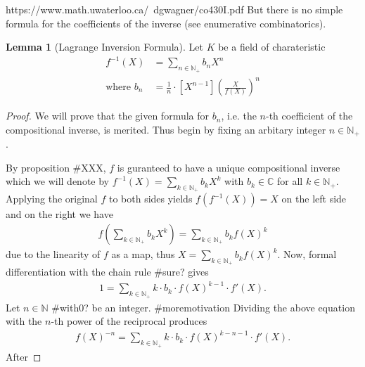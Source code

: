 \documentclass[a4paper]{article}
\theoremstyle{definition}
\newtheorem{lemma}[definition]{Lemma}
\begin{document}
https://www.math.uwaterloo.ca/~dgwagner/co430I.pdf
%
But there is no simple formula for the coefficients of the inverse (see enumerative combinatorics).
%
\begin{lemma}[Lagrange Inversion Formula]
    Let \(K\) be a field of charateristic
    \begin{align*}
        f^{-1}(X) &= \sum_{n \in \mathbb{N}_+} b_n X^n\\
        \text{where } b_n &= \frac{1}{n} \cdot [X^{n-1}] \left(\frac{X}{f(X)}\right)^n
    \end{align*}
\end{lemma}
%
\begin{proof}
    We will prove that the given formula for \(b_n\), i.e. the \(n\)-th coefficient of the compositional inverse, is merited. Thus begin by fixing an arbitary integer \(n \in \mathbb{N}_+\).


    By proposition \#XXX, \(f\) is guranteed to have a unique compositional inverse which we will denote by \(f^{-1}(X) = \sum_{k \in \mathbb{N}_+} b_k X^k\) with \(b_k \in \mathbb{C}\) for all \(k \in \mathbb{N}_+\). Applying the original \(f\) to both sides yields \(f(f^{-1} (X)) = X\) on the left side and on the right we have
    \begin{align*}
        f\left( \sum_{k \in \mathbb{N}_+} b_k X^k \right) = \sum_{k \in \mathbb{N}_+} b_k f(X)^k
    \end{align*}
    due to the linearity of \(f\) as a map, thus \(X = \sum_{k \in \mathbb{N}_+} b_k f(X)^k\). Now, formal differentiation with the chain rule \#sure? gives
    \begin{align*}
        1 = \sum_{k \in \mathbb{N}_+} k \cdot b_k \cdot f(X)^{k-1} \cdot f'(X) \text{.}
    \end{align*}
    Let \(n \in \mathbb{N}\) \#with0? be an integer. \#moremotivation Dividing the above equation with the \(n\)-th power of the reciprocal produces
    \begin{align*}
        f(X)^{-n} = \sum_{k \in \mathbb{N}_+} k \cdot b_k \cdot f(X)^{k-n-1} \cdot f'(X) \text{.}
    \end{align*}
    After 
\end{proof}
%
\newpage
\end{document}
